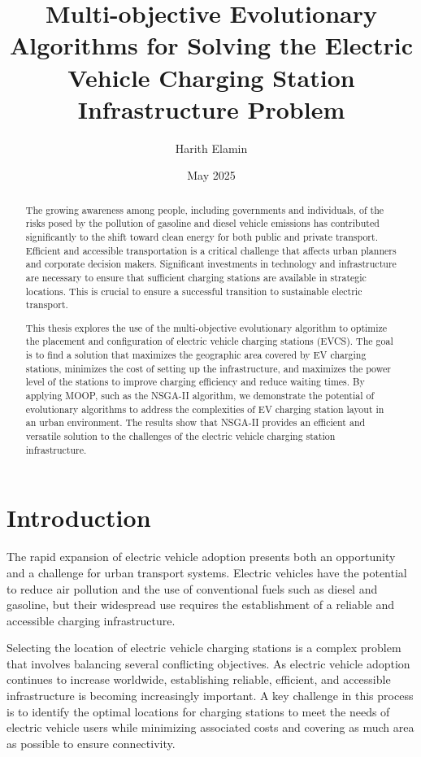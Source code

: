 \documentclass[12pt]{report}
\title{Multi-objective Evolutionary Algorithms for Solving the Electric Vehicle Charging Station Infrastructure Problem}
\author{Harith Elamin}
\date{May 2025}
\begin{document}
\maketitle

\tableofcontents
\newpage

\listoffigures
\newpage

\begin{abstract}
The growing awareness among people, including governments and individuals, of the risks posed by the pollution of gasoline and diesel vehicle emissions has contributed significantly to the shift toward clean energy for both public and private transport. Efficient and accessible transportation is a critical challenge that affects urban planners and corporate decision makers. Significant investments in technology and infrastructure are necessary to ensure that sufficient charging stations are available in strategic locations. This is crucial to ensure a successful transition to sustainable electric transport.

This thesis explores the use of the multi-objective evolutionary algorithm to optimize the placement and configuration of electric vehicle charging stations (EVCS). The goal is to find a solution that maximizes the geographic area covered by EV charging stations, minimizes the cost of setting up the infrastructure, and maximizes the power level of the stations to improve charging efficiency and reduce waiting times. By applying MOOP, such as the NSGA-II algorithm, we demonstrate the potential of evolutionary algorithms to address the complexities of EV charging station layout in an urban environment. The results show that NSGA-II provides an efficient and versatile solution to the challenges of the electric vehicle charging station infrastructure.
\end{abstract}

\chapter{Introduction}
The rapid expansion of electric vehicle adoption presents both an opportunity and a challenge for urban transport systems. Electric vehicles have the potential to reduce air pollution and the use of conventional fuels such as diesel and gasoline, but their widespread use requires the establishment of a reliable and accessible charging infrastructure.

Selecting the location of electric vehicle charging stations is a complex problem that involves balancing several conflicting objectives. As electric vehicle adoption continues to increase worldwide, establishing reliable, efficient, and accessible infrastructure is becoming increasingly important. A key challenge in this process is to identify the optimal locations for charging stations to meet the needs of electric vehicle users while minimizing associated costs and covering as much area as possible to ensure connectivity.
\end{document}
